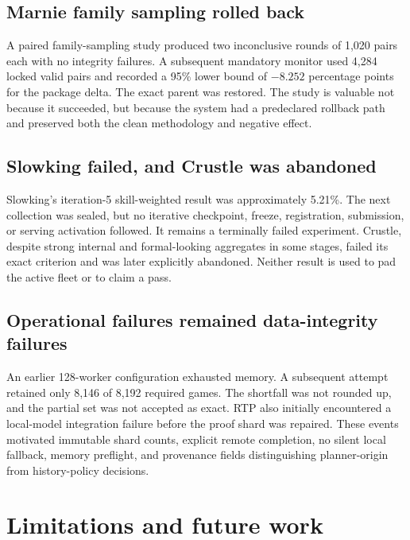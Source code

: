 \documentclass[10pt]{article}
\begin{document}
\subsection{Marnie family sampling rolled back}

A paired family-sampling study produced two inconclusive rounds of 1,020 pairs each with no integrity failures. A subsequent mandatory monitor used 4,284 locked valid pairs and recorded a 95\% lower bound of $-8.252$ percentage points for the package delta. The exact parent was restored. The study is valuable not because it succeeded, but because the system had a predeclared rollback path and preserved both the clean methodology and negative effect.

\subsection{Slowking failed, and Crustle was abandoned}

Slowking's iteration-5 skill-weighted result was approximately 5.21\%. The next collection was sealed, but no iterative checkpoint, freeze, registration, submission, or serving activation followed. It remains a terminally failed experiment. Crustle, despite strong internal and formal-looking aggregates in some stages, failed its exact criterion and was later explicitly abandoned. Neither result is used to pad the active fleet or to claim a pass.

\subsection{Operational failures remained data-integrity failures}

An earlier 128-worker configuration exhausted memory. A subsequent attempt retained only 8,146 of 8,192 required games. The shortfall was not rounded up, and the partial set was not accepted as exact. RTP also initially encountered a local-model integration failure before the proof shard was repaired. These events motivated immutable shard counts, explicit remote completion, no silent local fallback, memory preflight, and provenance fields distinguishing planner-origin from history-policy decisions.

\section{Limitations and future work}
\end{document}
